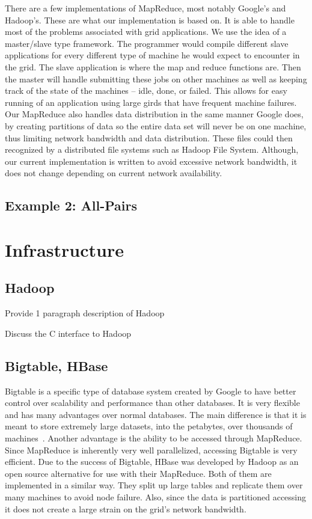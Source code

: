 \documentclass{rspublic}
\begin{document}
There are a few implementations of MapReduce, most notably Google's and
Hadoop's.  These are what our implementation is based on.  It is able
to handle most of the problems associated with grid applications.  We use
the idea of a master/slave type framework.  The programmer would compile
different slave applications for every different type of machine he 
would expect to encounter in the grid.  The slave application is
where the map and reduce functions are.  Then the master will handle
submitting these jobs on other machines as well as keeping track of
the state of the machines -- idle, done, or failed.  This allows for
easy running of an application using large girds that have frequent
machine failures.  Our MapReduce also handles data distribution in the
same manner Google does, by creating partitions of data so the entire
data set will never be on one machine, thus limiting network bandwidth
and data distribution.  These files could then recognized by a
distributed file systems such as Hadoop File System.  Although, our
current implementation is written to avoid excessive network
bandwidth, it does not change depending on current network
availability.


\subsection{Example 2: All-Pairs}

\section*{Infrastructure}

\subsection*{Hadoop}

Provide 1 paragraph description of Hadoop

Discuss the C interface to Hadoop

\subsection*{Bigtable, HBase}

Bigtable is a specific type of database system created by Google to 
have better control over scalability and performance than other 
databases.  It is very flexible and has many advantages over normal 
databases.  The main difference is that it is meant to store extremely 
large datasets, into the petabytes, over thousands of machines~\cite{bigtable}.  
Another advantage is the ability to be accessed through MapReduce.  Since 
MapReduce is inherently very well parallelized, accessing Bigtable is very 
efficient.  Due to the success of Bigtable, HBase was developed by Hadoop as 
an open source alternative for use with their MapReduce.  Both of them are 
implemented in a similar way.  They split up large tables and replicate them 
over many machines to avoid node failure.  Also, since the data is partitioned 
accessing it does not create a large strain on the grid's network bandwidth.
\end{document}
